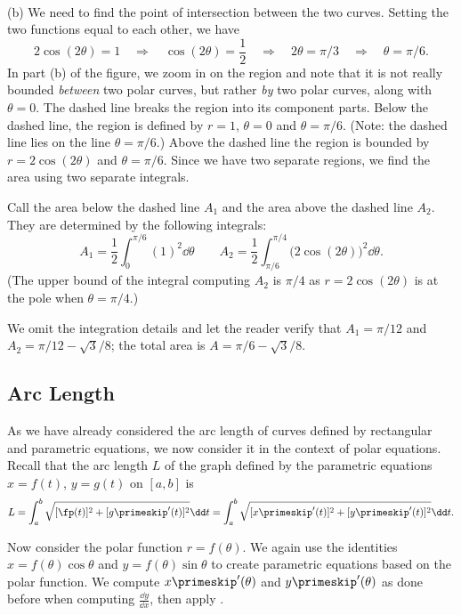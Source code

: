 \begin{example}
{\\(b)}
%
We need to find the point of intersection between the two curves. Setting the two functions equal to each other, we have
\[
2\cos(2\theta) = 1 \quad \Rightarrow \quad \cos(2\theta) = \frac12
\quad \Rightarrow \quad 2\theta = \pi/3\quad \Rightarrow \quad \theta=\pi/6.
\]
In part (b) of the figure, we zoom in on the region and note that it is not really bounded \emph{between} two polar curves, but rather \emph{by} two polar curves, along with $\theta=0$. The dashed line breaks the region into its component parts. Below the dashed line, the region is defined by $r=1$, $\theta=0$ and $\theta = \pi/6$. (Note: the dashed line lies on the line $\theta=\pi/6$.) Above the dashed line the region is bounded by $r=2\cos(2\theta)$ and $\theta =\pi/6$. Since we have two separate regions, we find the area using two separate integrals.

Call the area below the dashed line $A_1$ and the area above the dashed line $A_2$. They are determined by the following integrals:
\[
A_1 = \frac12\int_0^{\pi/6} (1)^2\dd\theta\qquad
A_2 = \frac12\int_{\pi/6}^{\pi/4} \bigl(2\cos(2\theta)\bigr)^2\dd\theta.
\]
(The upper bound of the integral computing $A_2$ is $\pi/4$ as $r=2\cos(2\theta)$ is at the pole when $\theta=\pi/4$.)

We omit the integration details and let the reader verify that $A_1 = \pi/12$ and $A_2 = \pi/12-\sqrt{3}/8$; the total area is $A = \pi/6-\sqrt{3}/8$.
\end{example}

\subsection{Arc Length}

As we have already considered the arc length of curves defined by rectangular and parametric equations, we now consider it in the context of polar equations. Recall that the arc length $L$ of the graph defined by the parametric equations $x=f(t)$, $y=g(t)$ on $[a,b]$ is
\begin{equation}
L = \int_a^b \sqrt{[\fp(t)]^2 + [g\primeskip'(t)]^2}\dd t = \int_a^b \sqrt{[x\primeskip'(t)]^2+[y\primeskip'(t)]^2}\dd t.
\label{eq:polar_arclength}
\end{equation}

Now consider the polar function $r=f(\theta)$. We again use the identities $x=f(\theta)\cos\theta$ and $y=f(\theta)\sin\theta$ to create parametric equations based on the polar function. We compute $x\primeskip'(\theta)$ and $y\primeskip'(\theta)$ as done before when computing $\frac{\dd y}{\dd x}$, then apply .

